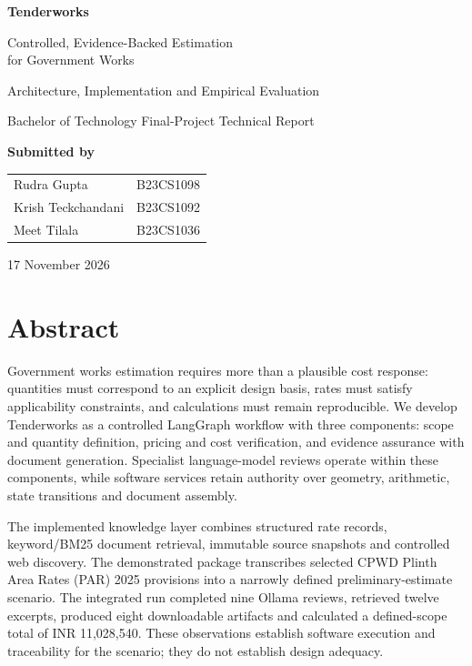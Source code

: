 \documentclass[11pt,a4paper]{article}
\begin{document}
\begin{titlepage}
\centering\vspace*{25mm}
{\Huge\bfseries\color{navy} Tenderworks\par}\vspace{8mm}
{\LARGE Controlled, Evidence-Backed Estimation\\for Government Works\par}\vspace{12mm}
{\Large Architecture, Implementation and Empirical Evaluation\par}\vspace{15mm}
{\large Bachelor of Technology Final-Project Technical Report\par}\vspace{7mm}
{\large\textbf{Submitted by}\par}\vspace{3mm}
{\large
\begin{tabular}{@{}ll@{}}
Rudra Gupta & B23CS1098 \\
Krish Teckchandani & B23CS1092 \\
Meet Tilala & B23CS1036
\end{tabular}\par}\vspace{7mm}
{17 November 2026\par}
\vfill
\end{titlepage}
\section*{Abstract}
Government works estimation requires more than a plausible cost response: quantities must correspond to an explicit design basis, rates must satisfy applicability constraints, and calculations must remain reproducible. We develop Tenderworks as a controlled LangGraph workflow with three components: scope and quantity definition, pricing and cost verification, and evidence assurance with document generation. Specialist language-model reviews operate within these components, while software services retain authority over geometry, arithmetic, state transitions and document assembly.

The implemented knowledge layer combines structured rate records, keyword/BM25 document retrieval, immutable source snapshots and controlled web discovery. The demonstrated package transcribes selected CPWD Plinth Area Rates (PAR) 2025 provisions into a narrowly defined preliminary-estimate scenario. The integrated run completed nine Ollama reviews, retrieved twelve excerpts, produced eight downloadable artifacts and calculated a defined-scope total of INR 11,028,540. These observations establish software execution and traceability for the scenario; they do not establish design adequacy.
\end{document}
